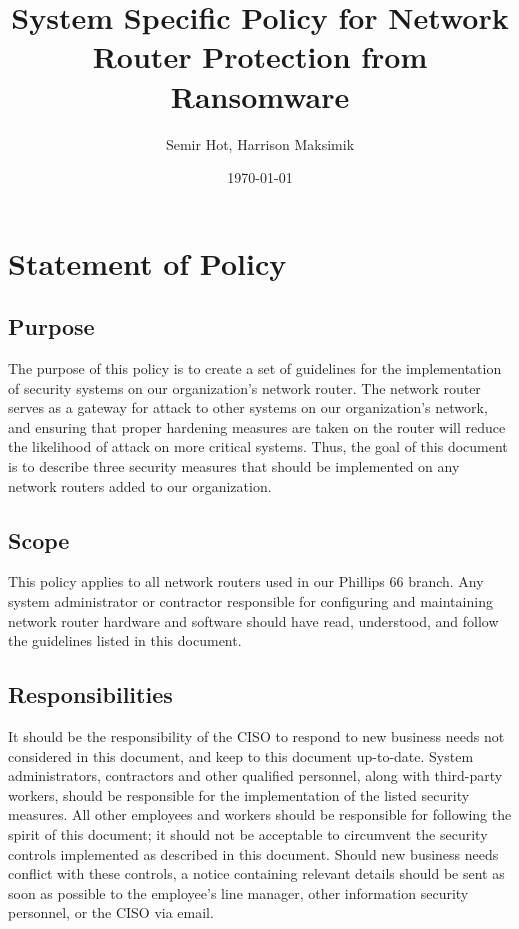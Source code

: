 \documentclass[11pt]{article}
\author{Semir Hot, Harrison Maksimik}
\date{\today}
\title{System Specific Policy for Network Router Protection from Ransomware}
\begin{document}
\maketitle
\tableofcontents

\section{Statement of Policy}
\label{sec:org2ce9cb3}
\subsection{Purpose}
\label{sec:orgb0fb1af}
The purpose of this policy is to create a set of guidelines for the implementation of security systems on our organization's network router. The network router serves as a gateway for attack to other systems on our organization's network, and ensuring that proper hardening measures are taken on the router will reduce the likelihood of attack on more critical systems. Thus, the goal of this document is to describe three security measures that should be implemented on any network routers added to our organization.

\subsection{Scope}
\label{sec:orge5ecbb4}
This policy applies to all network routers used in our Phillips 66 branch. Any system administrator or contractor responsible for configuring and maintaining network router hardware and software should have read, understood, and follow the guidelines listed in this document.

\subsection{Responsibilities}
\label{sec:org77e8750}
It should be the responsibility of the CISO to respond to new business needs not considered in this document, and keep to this document up-to-date. System administrators, contractors and other qualified personnel, along with third-party workers, should be responsible for the implementation of the listed security measures. All other employees and workers should be responsible for following the spirit of this document; it should not be acceptable to circumvent the security controls implemented as described in this document. Should new business needs conflict with these controls, a notice containing relevant details should be sent as soon as possible to the employee's line manager, other information security personnel, or the CISO via email.
\end{document}
